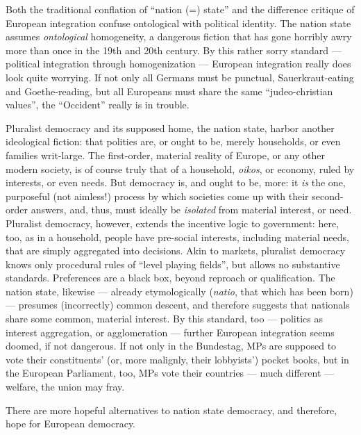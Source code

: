 \documentclass[11pt,a4paper,oneside,openright]{article}
\begin{document}
Both the traditional conflation of ``nation (=) state'' and the difference critique of European integration confuse ontological with political identity. 
The nation state assumes \emph{ontological} homogeneity, a dangerous fiction that has gone horribly awry more than once in the 19th and 20th century. By this rather sorry standard --- political integration through homogenization --- European integration really does look quite worrying. 
If not only all Germans must be punctual, Sauerkraut-eating and Goethe-reading, but all Europeans must share the same ``judeo-christian values'', the ``Occident'' really is in trouble.

Pluralist democracy and its supposed home, the nation state, harbor another ideological fiction: 
that polities are, or ought to be, merely households, or even families writ-large. 
The first-order, material reality of Europe, or any other modern society, is of course truly that of a household, \emph{oikos}, or economy, ruled by interests, or even needs. 
But democracy is, and ought to be, more: 
it \emph{is} the one, purposeful (not aimless!) process by which societies come up with their second-order answers, and, thus, must ideally be \emph{isolated} from material interest, or need. 
Pluralist democracy, however, extends the incentive logic to government: 
here, too, as in a household, people have pre-social interests, including material needs, that are simply aggregated into decisions. 
Akin to markets, pluralist democracy knows only procedural rules of ``level playing fields'', but allows no substantive standards. 
Preferences are a black box, beyond reproach or qualification. 
The nation state, likewise --- already etymologically (\emph{natio}, that which has been born) --- presumes (incorrectly) common descent, and therefore suggests that nationals share some common, material interest. 
By this standard, too --- politics as interest aggregation, or agglomeration --- further European integration seems doomed, if not dangerous. 
If not only in the Bundestag, MPs are supposed to vote their constituents' (or, more malignly, their lobbyists') pocket books, but in the European Parliament, too, MPs vote their countries --- much different --- welfare, the union may fray.

There are more hopeful alternatives to nation state democracy, and therefore, hope for European democracy. 
\end{document}
